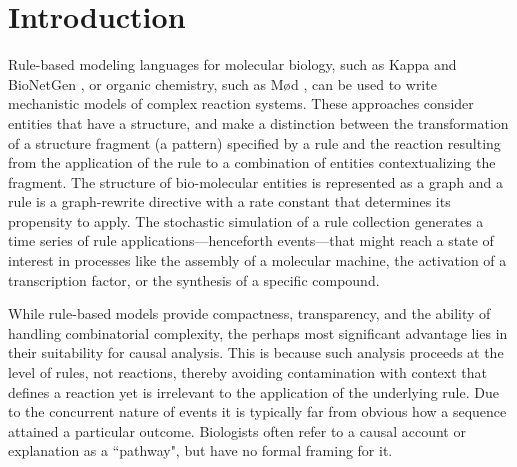 
\section{Introduction}\label{sec:intro}

Rule-based modeling languages for molecular biology, such as Kappa
\cite{DanosEtAl-CONCUR07} and BioNetGen \cite{bngl}, or organic chemistry, such
as M{\o}d \cite{moll}, can be used to write mechanistic models of complex
reaction systems. These approaches consider entities that have a structure, and
make a distinction between the transformation of a structure fragment (a
pattern) specified by a rule and the reaction resulting from the application of
the rule to a combination of entities contextualizing the fragment. The
structure of bio-molecular entities is represented as a graph and a rule is a
graph-rewrite directive with a rate constant that determines its propensity to
apply. The stochastic simulation of a rule collection generates a time series of
rule applications---henceforth events---that might reach a state of interest in
processes like the assembly of a molecular machine, the activation of a
transcription factor, or the synthesis of a specific compound.

While rule-based models provide compactness, transparency, and the ability of
handling combinatorial complexity, the perhaps most significant advantage lies
in their suitability for causal analysis. This is because such analysis proceeds
at the level of rules, not reactions, thereby avoiding contamination with
context that defines a reaction yet is irrelevant to the application of the
underlying rule. Due to the concurrent nature of events it is typically far from
obvious how a sequence attained a particular outcome. Biologists often refer to
a causal account or explanation as a ``pathway", but have no formal framing for
it.

